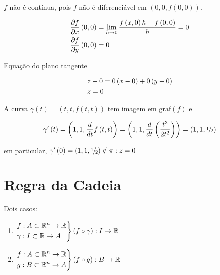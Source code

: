 \documentclass{book}
\begin{document}
\begin{sol}
    $f$ n\~ao \'e cont\'inua, pois $f$ n\~ao \'e diferenci\'avel em $\left( {0,0,f\left( {0,0} \right)} \right)$.

\[
\begin{gathered}
\frac{{\partial f}}
{{\partial x}}\left( {0,0} \right) = \mathop {\lim }\limits_{h \to 0} \frac{{f\left( {x,0} \right)h - f\left( {0,0} \right)}}
{h} = 0 \hfill \\
\frac{{\partial f}}
{{\partial y}}\left( {0,0} \right) = 0 \hfill \\
\end{gathered}
\]

Equa\c c\~ao do plano tangente

\[
\begin{gathered}
z - 0 = 0\left( {x - 0} \right) + 0\left( {y - 0} \right) \hfill \\
z = 0 \hfill \\
\end{gathered}
\]

    A curva $\gamma \left( t \right) = \left( {t,t,f\left( {t,t} \right)} \right)$ tem imagem em ${\text{graf}}\left( f \right)$ e

\[
\gamma '\left( t \right) = \left( {1,1,\frac{d}
{{dt}}f\left( {t,t} \right)} \right) = \left( {1,1,\frac{d}
{{dt}}\left( {\frac{{t^3 }}
{{2t^2 }}} \right)} \right) = \left( {1,1,{\raise0.5ex\hbox{$\scriptstyle 1$}
\kern-0.1em/\kern-0.15em
\lower0.25ex\hbox{$\scriptstyle 2$}}} \right)
\]

    em particular, $\gamma '\left( 0 \right) = \left( {1,1,{\raise0.5ex\hbox{$\scriptstyle 1$}
\kern-0.1em/\kern-0.15em
\lower0.25ex\hbox{$\scriptstyle 2$}}} \right) \notin \pi :z = 0$
\end{sol}

\section{Regra da Cadeia}
\label{sec16}

Dois casos:

\begin{enumerate}
\item $\left. \begin{gathered}
f:A \subset \R^n  \to \R \hfill \\
\gamma :I \subset \R \to A \hfill \\
\end{gathered}  \right\}\left( {f \circ \gamma } \right):I \to \R$
\item $\left. \begin{gathered}
f:A \subset \R^n  \to \R \hfill \\
g:B \subset \R^n  \to A \hfill \\
\end{gathered}  \right\}\left( {f \circ g} \right):B \to \R$
\end{enumerate}
\end{document}
